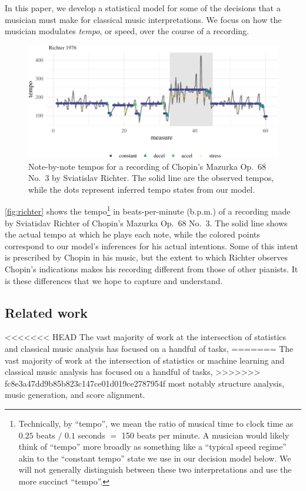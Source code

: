 \documentclass[aoas]{imsart}
\begin{document}
In this paper, we develop a statistical model for some of the
decisions that a musician must make for classical music
interpretations. We focus on how the musician modulates
{\it tempo}, or speed, over the course of a recording. 
\begin{figure}[t]
  \centering
  \includegraphics[width=.9\linewidth]{richter-1}
  \caption{Note-by-note tempos for a recording of Chopin's Mazurka
    Op.\ 68 No.\ 3 by Sviatislav Richter. The solid line are the
    observed tempos, while the dots represent inferred tempo states
    from our model. }
  \label{fig:richter}
\end{figure}
\autoref{fig:richter} shows the tempo\footnote{Technically, by
  ``tempo'', we mean the ratio of musical time to clock time as $0.25$
  beats $/$ $0.1$ seconds $=$ 150 beats per minute. A musician would
  likely think of ``tempo'' more broadly as something like a ``typical
  speed regime'' akin to the ``constant tempo'' state we use in our
  decision model below. We will not generally distinguish between
  these two interpretations and use the more succinct ``tempo''.}
  in beats-per-minute (b.p.m.) of
a recording made by Sviatislav Richter of Chopin's Mazurka Op.\ 68
No.\ 3. The solid line shows the actual tempo at which he plays each
note, while the colored points correspond to our model's inferences
for his actual intentions. Some of this intent is prescribed  by
Chopin in his music, but the extent to which Richter observes Chopin's
indications makes his recording different from those of other
pianists. It is these differences that we hope to capture and understand.

\subsection{Related work}
\label{sec:related-work}


 
<<<<<<< HEAD
The vast majority of work at the intersection of statistics
and classical music analysis has focused on a handful of tasks,
=======
The vast majority of work at the intersection of statistics or machine
learning and classical music analysis has focused on a handful of tasks,
>>>>>>> fc8e3a47dd9b85b823c147ce01d019ce2787954f
most notably structure analysis, music generation, and score
alignment.
\end{document}
